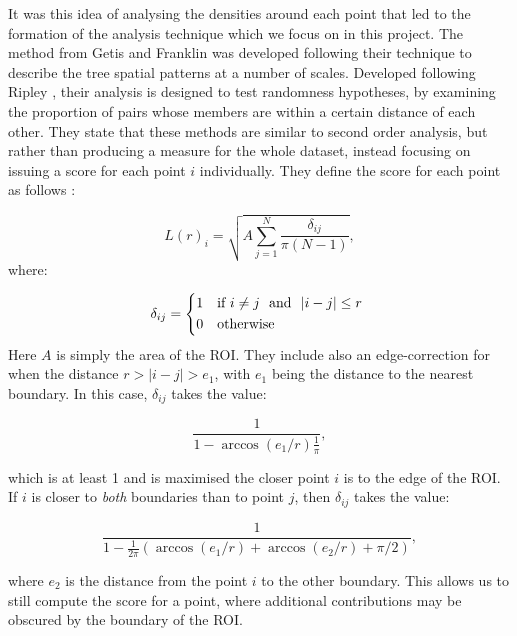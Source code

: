\documentclass[11pt]{article}
\begin{document}
It was this idea of analysing the densities around each point that led to the formation of the analysis technique which we focus on in this project. The method from Getis and Franklin \cite{getisAndFranklin} was developed following their technique to describe the tree spatial patterns at a number of scales. Developed following Ripley \cite{ripley1977modelling}, their analysis is designed to test randomness hypotheses, by examining the proportion of pairs whose members are within a certain distance of each other\cite{getisAndFranklin,ripley1977modelling}. They state that these methods are similar to second order analysis, but rather than producing a measure for the whole dataset, instead focusing on issuing a score for each point $i$ individually. They define the score for each point as follows \cite{getisAndFranklin}:

\begin{equation*}
	L(r)_i = \sqrt{A \sum_{j = 1}^{N} \frac{\delta_{ij}}{\pi(N-1)} },
\end{equation*}
where:

\begin{equation*}
	\delta_{ij} =
	\begin{cases*}
		1 & if $i \neq j$ \ \text{and} \ $|i - j| \leq r$ \\
		0 & otherwise
	\end{cases*}
\end{equation*}
Here $A$ is simply the area of the ROI.	
They include also an edge-correction for when the distance $r > |i - j| > e_1 $, with $e_1$ being the distance to the nearest boundary. In this case, $\delta_{ij}$ takes the value:

\begin{equation}
\label{edgecorrection}
	\frac{1}{1 - \arccos(e_1 / r) \frac{1}{\pi}},
\end{equation}  

which is at least 1 and is maximised the closer point $i$ is to the edge of the ROI. If $i$ is closer to \textit{both} boundaries than to point $j$, then $\delta_{ij}$ takes the value:

\begin{equation*}
	\frac{1}{1 - \frac{1}{2\pi} ( \arccos(e_1/r) + \arccos(e_2 / r) + \pi / 2 )},
\end{equation*}

where $e_2$ is the distance from the point $i$ to the other boundary. This allows us to still compute the score for a point, where additional contributions may be obscured by the boundary of the ROI.\\
\end{document}
